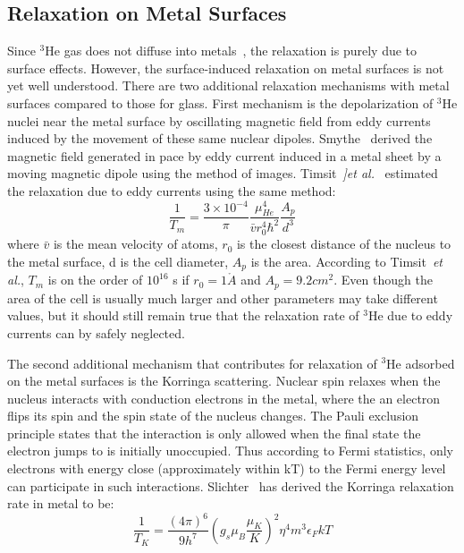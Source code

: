 \subsection{Relaxation on Metal Surfaces}

Since $^{3}$He gas does not diffuse into metals~\cite{barrer}, the relaxation is purely due to surface effects. However, the surface-induced relaxation on metal surfaces is not yet well understood. There are two additional relaxation mechanisms with metal surfaces compared to those for glass. First mechanism is the depolarization of $^{3}$He nuclei near the metal surface by oscillating magnetic field from eddy currents induced by the movement of these same nuclear dipoles. Smythe~\cite{Smythe} derived the magnetic field generated in pace by eddy current induced in a metal sheet by a moving magnetic dipole using the method of images. Timsit~\emph{]et al.}~\cite{Timsit} estimated the relaxation due to eddy currents using the same method:
\begin{equation}
\frac{1}{T_m} = \frac{3\times 10^{-4}}{\pi} \frac{\mu_{He}^4}{\bar{v}r_{0}^{4}\hbar^{2}}\frac{A_p}{d^3}
\end{equation}
where $\bar{v}$ is the mean velocity of atoms, $r_0$ is the closest distance of the nucleus to the metal surface, d is the cell diameter, $A_p$ is the area. According to Timsit~\emph{et al.}, $T_m$ is on the order of $10^{16}$ s if $r_0=1\mathring{A}$ and $A_p = 9.2cm^2$. Even though the area of the cell is usually much larger and other parameters may take different values, but it should still remain true that the relaxation rate of $^{3}$He due to eddy currents can by safely neglected.

The second additional mechanism that contributes for relaxation of $^{3}$He adsorbed on the metal surfaces is the Korringa scattering. Nuclear spin relaxes when the nucleus interacts with conduction electrons in the metal, where the an electron flips its spin and the spin state of the nucleus changes. The Pauli exclusion principle states that the interaction is only allowed when the final state the electron jumps to is initially unoccupied. Thus according to Fermi statistics, only electrons with energy close (approximately within kT) to the Fermi energy level can participate in such interactions. Slichter~\cite{Slichter} has derived the Korringa relaxation rate in metal to be:
\begin{equation}
\frac{1}{T_K}=\frac{(4\pi)^6}{9h^7}(g_s\mu_B \frac{\mu_K}{K})^2 \eta^4m^3\epsilon_F kT
\end{equation}

